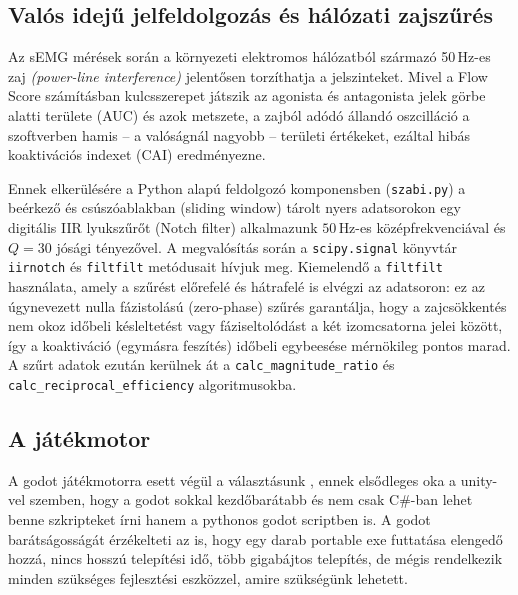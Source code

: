 \subsection{Valós idejű jelfeldolgozás és hálózati zajszűrés}

Az sEMG mérések során a környezeti elektromos hálózatból származó 50\,Hz-es zaj \textit{(power-line interference)} jelentősen torzíthatja a jelszinteket. Mivel a Flow Score számításban kulcsszerepet játszik az agonista és antagonista jelek görbe alatti területe (AUC) és azok metszete, a zajból adódó állandó oszcilláció a szoftverben hamis -- a valóságnál nagyobb -- területi értékeket, ezáltal hibás koaktivációs indexet (CAI) eredményezne.

Ennek elkerülésére a Python alapú feldolgozó komponensben (\texttt{szabi.py}) a beérkező és csúszóablakban (sliding window) tárolt nyers adatsorokon egy digitális IIR lyukszűrőt (Notch filter) alkalmazunk $50\,$Hz-es középfrekvenciával és $Q=30$ jósági tényezővel. A megvalósítás során a \texttt{scipy.signal} könyvtár \texttt{iirnotch} és \texttt{filtfilt} metódusait hívjuk meg. Kiemelendő a \texttt{filtfilt} használata, amely a szűrést előrefelé és hátrafelé is elvégzi az adatsoron: ez az úgynevezett nulla fázistolású (zero-phase) szűrés garantálja, hogy a zajcsökkentés nem okoz időbeli késleltetést vagy fáziseltolódást a két izomcsatorna jelei között, így a koaktiváció (egymásra feszítés) időbeli egybeesése mérnökileg pontos marad. A szűrt adatok ezután kerülnek át a \texttt{calc\_magnitude\_ratio} és \texttt{calc\_reciprocal\_efficiency} algoritmusokba.

\subsection{A játékmotor}

A godot játékmotorra esett végül a választásunk \cite{godot_engine}, ennek elsődleges oka a unity-vel szemben, hogy a godot sokkal kezdőbarátabb és nem csak C\#-ban lehet benne szkripteket írni hanem a pythonos godot scriptben is. A godot barátságosságát érzékelteti az is, hogy egy darab portable exe futtatása elengedő hozzá, nincs hosszú telepítési idő, több gigabájtos telepítés, de mégis rendelkezik minden szükséges fejlesztési eszközzel, amire szükségünk lehetett. 